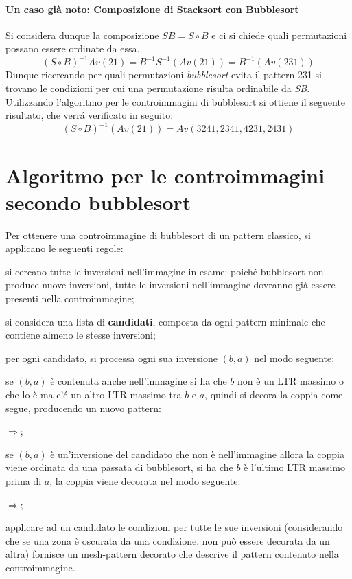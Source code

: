 \paragraph*{Un caso gi\`a noto: Composizione di Stacksort con Bubblesort} Si considera dunque la composizione $SB = S\circ{B}$ e ci si chiede quali permutazioni possano essere ordinate da essa.$$(S\circ B)^{-1}Av(21)=B^{-1}S^{-1}(Av(21))=B^{-1}(Av(231))$$
Dunque ricercando per quali permutazioni \textit{bubblesort} evita il pattern 231 si trovano le condizioni per cui una permutazione risulta ordinabile da \textit{SB}.\\
Utilizzando l'algoritmo per le controimmagini di bubblesort\cite{albert2010inverse} si ottiene il seguente risultato, che verr\'a verificato in seguito:
$$(S\circ B)^{-1}(Av(21))=Av(3241, 2341, 4231, 2431)$$
\section{Algoritmo per le controimmagini secondo bubblesort}
Per ottenere una controimmagine di bubblesort di un pattern classico, si applicano le seguenti regole:
\begin{description}
	\item si cercano tutte le inversioni nell'immagine in esame: poich\'e bubblesort non produce nuove inversioni, tutte le inversioni nell'immagine dovranno gi\`a essere presenti nella controimmagine;
	\item si considera una lista di \textbf{candidati}, composta da ogni pattern minimale che contiene almeno le stesse inversioni;
	\item per ogni candidato, si processa ogni sua inversione $(b,a)$ nel modo seguente:
	\begin{description}
	\item se $(b,a)$ \`e contenuta anche nell'immagine si ha che $b$ non \`e un LTR massimo o che lo \`e ma c'\'e un altro LTR massimo tra $b$ e $a$, quindi si decora la coppia come segue, producendo un nuovo pattern:
	\begin{center}
		$\Rightarrow$;
	\end{center}
	\item se $(b,a)$ \`e un'inversione del candidato che non \`e nell'immagine allora la coppia viene ordinata da una passata di bubblesort, si ha che $b$ \`e l'ultimo LTR massimo prima di $a$, la coppia viene decorata nel modo seguente:
	\begin{center}
		$\Rightarrow$;\\
	\end{center}
	\end{description}
	\item applicare ad un candidato le condizioni per tutte le sue inversioni (considerando che se una zona \`e oscurata da una condizione, non pu\`o essere decorata da un altra) fornisce un mesh-pattern decorato che descrive il pattern contenuto nella controimmagine.
\end{description}
